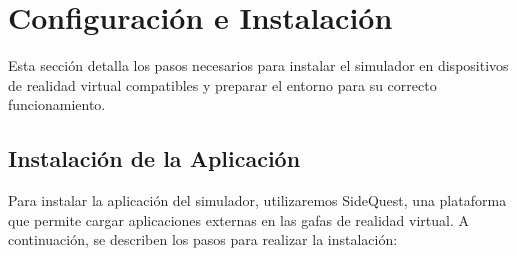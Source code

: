 \section{Configuración e Instalación}

Esta sección detalla los pasos necesarios para instalar el simulador en dispositivos de realidad virtual compatibles y preparar el entorno para su correcto funcionamiento.

\subsection{Instalación de la Aplicación}

Para instalar la aplicación del simulador, utilizaremos SideQuest, una plataforma que permite cargar aplicaciones externas en las gafas de realidad virtual. A continuación, se describen los pasos para realizar la instalación:

